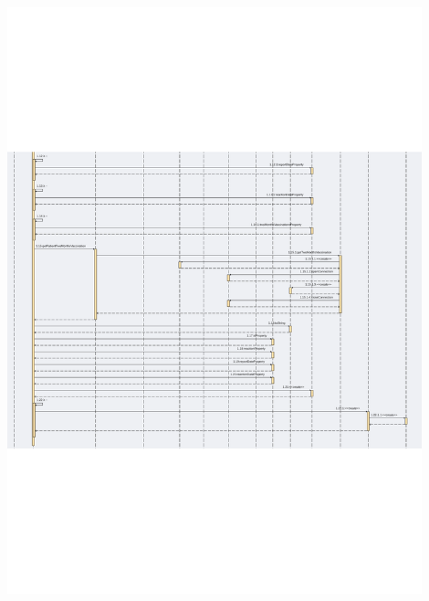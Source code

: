 \documentclass[11pt]{article}
\begin{document}
    \newpage
    \begin{center}
        \includegraphics[width=0.90\textwidth]{pictures/prova_002.png}
    \end{center}

    \newpage
\end{document}
